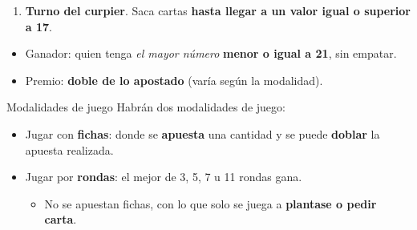 
\begin{frame}
	\begin{enumerate}[3]
	    \item \textbf{Turno del curpier}. Saca cartas \textbf{hasta llegar a un valor igual o superior a 17}.
	\end{enumerate}
    \begin{itemize}
        \item Ganador: quien tenga \textit{el mayor número} \textbf{menor o igual a 21}, sin empatar.
        \item Premio: \textbf{doble de lo apostado} (varía según la modalidad). 
    \end{itemize}
    
\end{frame}


\begin{frame}{Modalidades de juego}
    Habrán dos modalidades de juego:
    \begin{itemize}
        \item Jugar con \textbf{fichas}: donde se \textbf{apuesta} una cantidad y se puede \textbf{doblar} la apuesta realizada.
        \item Jugar por \textbf{rondas}: el mejor de 3, 5, 7 u 11 rondas gana.
        \begin{itemize}
            \item No se apuestan fichas, con lo que solo se juega a \textbf{plantase o pedir carta}.
        \end{itemize}
    \end{itemize}
\end{frame}


